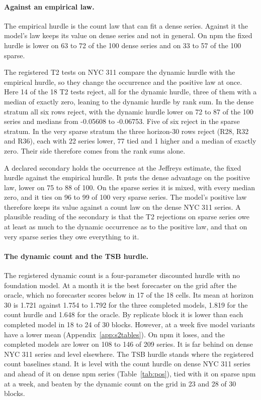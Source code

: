 \paragraph{Against an empirical law.} The empirical hurdle is the count law that can fit a dense series.
Against it the model's law keeps its value on dense series and not in general. On npm the fixed hurdle is
lower on 63 to 72 of the 100 dense series and on 33 to 57 of the 100 sparse.

The registered T2 tests on NYC 311 compare the dynamic hurdle with the empirical hurdle, so they change the
occurrence and the positive law at once. Here 14 of the 18 T2 tests reject, all for the dynamic hurdle, three
of them with a median of exactly zero, leaning to the dynamic hurdle by rank sum. In the dense stratum all six
rows reject, with the dynamic hurdle lower on 72 to 87 of the 100 series and medians from -0.05608 to
-0.06753. Five of six reject in the sparse stratum. In the very sparse stratum the three horizon-30 rows
reject (R28, R32 and R36), each with 22 series lower, 77 tied and 1 higher and a median of exactly zero. Their
side therefore comes from the rank sums alone.

A declared secondary holds the occurrence at the Jeffreys estimate, the fixed hurdle against the empirical
hurdle. It puts the dense advantage on the positive law, lower on 75 to 88 of 100. On the sparse series it is
mixed, with every median zero, and it ties on 96 to 99 of 100 very sparse series. The model's positive law
therefore keeps its value against a count law on the dense NYC 311 series. A plausible reading of the
secondary is that the T2 rejections on sparse series owe at least as much to the dynamic occurrence as to the
positive law, and that on very sparse series they owe everything to it.

\paragraph{The dynamic count and the TSB hurdle.} The registered dynamic count is a four-parameter discounted
hurdle with no foundation model. At a month it is the best forecaster on the grid after the oracle, which no
forecaster scores below in 17 of the 18 cells. Its mean \qs{} at horizon 30 is 1.721 against 1.754 to 1.792
for the three completed models, 1.819 for the count hurdle and 1.648 for the oracle. By replicate block it is
lower than each completed model in 18 to 24 of 30 blocks. However, at a week five model variants have a lower
mean (Appendix~\ref{app:s2tables}). On npm it loses, and the completed models are lower on 108 to 146 of 209
series. It is far behind on dense NYC 311 series and level elsewhere. The TSB hurdle stands where the
registered count baselines stand. It is level with the count hurdle on dense NYC 311 series and ahead of it on
dense npm series (Table~\ref{tab:pos}), tied with it on sparse npm at a week, and beaten by the dynamic count
on the grid in 23 and 28 of 30 blocks.

